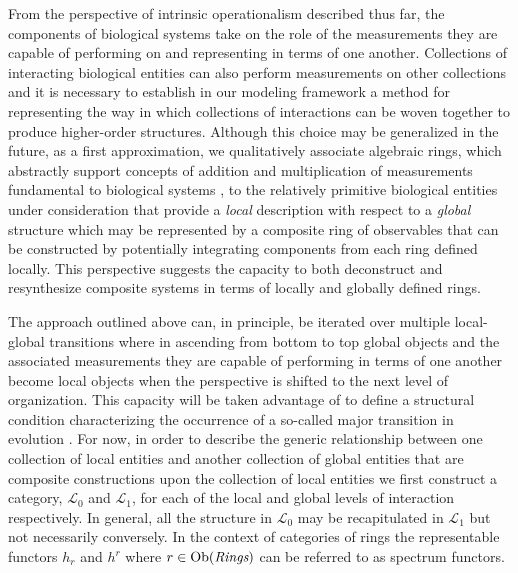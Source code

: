 \documentclass[aps,twocolumn]{revtex4-1}
\begin{document}
From the perspective of intrinsic operationalism described thus far, the components of biological systems take on the role of the measurements they are capable of performing on and representing in terms of one another. Collections of interacting biological entities can also perform measurements on other collections and it is necessary to establish in our modeling framework a method for representing the way in which collections of interactions can be woven together to produce higher-order structures. Although this choice may be generalized in the future, as a first approximation, we qualitatively associate algebraic rings, which abstractly support concepts of addition and multiplication of measurements fundamental to biological systems \cite{Houle2011}, to the relatively primitive biological entities under consideration that provide a {\it local} description with respect to a {\it global} structure which may be represented by a composite ring of observables that can be constructed by potentially integrating components from each ring defined locally. This perspective suggests the capacity to both deconstruct and resynthesize composite systems in terms of locally and globally defined rings.

The approach outlined above can, in principle, be iterated over multiple local-global transitions where in ascending from bottom to top global objects and the associated measurements they are capable of performing in terms of one another become local objects when the perspective is shifted to the next level of organization. This capacity will be taken advantage of to define a structural condition characterizing the occurrence of a so-called major transition in evolution \cite{MaynardSmith1995,Okasha2006,Calcott2011}. For now, in order to describe the generic relationship between one collection of local entities and another collection of global entities that are composite constructions upon the collection of local entities we first construct a category, $\mathcal{L}_0$ and $\mathcal{L}_1$, for each of the local and global levels of interaction respectively. In general, all the structure in $\mathcal{L}_0$ may be recapitulated in $\mathcal{L}_1$ but not necessarily conversely. In the context of categories of rings the representable functors $h_r$ and $h^r$ where $r \in \mathop{\rm Ob}\nolimits(\textit{Rings})$ can be referred to as spectrum functors.

\end{document}
